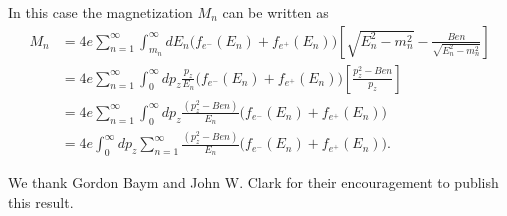 \documentclass[sn-mathphys,Numbered]{sn-jnl}
\begin{document}
In this case the magnetization $M_n$ can be written as
\begin{align}
M_n&=4e\sum_{n=1}^\infty \int_{m_n}^\infty\!\!dE_n\bigg(f_{e^-}(E_n)+f_{e^+}(E_n)\bigg)\left[{\sqrt{E^2_n-m^2_n}}-\frac{Ben}{\sqrt{E^2_n-m^2_n}}\right]\\
&=4e\sum_{n=1}^\infty \int_{0}^\infty\!\!dp_z\frac{p_z}{E_n}\bigg(f_{e^-}(E_n)+f_{e^+}(E_n)\bigg)\left[\frac{p_z^2-Ben}{p_z}\right]\\
&=4e\sum_{n=1}^\infty \int_{0}^\infty\!\!dp_z\frac{(p_z^2-Ben)}{E_n}\bigg(f_{e^-}(E_n)+f_{e^+}(E_n)\bigg)\\
&=4e \int_{0}^\infty\!\!dp_z\sum_{n=1}^\infty\frac{(p_z^2-Ben)}{E_n}\bigg(f_{e^-}(E_n)+f_{e^+}(E_n)\bigg).
\end{align}


\backmatter

We thank Gordon Baym and John W. Clark for their encouragement to publish this result.


\end{document}

